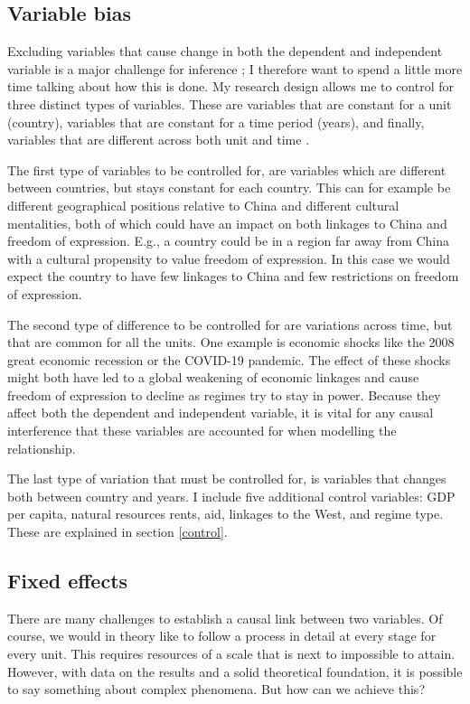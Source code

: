 \subsection{Variable bias}
Excluding variables that cause change in both the dependent and independent variable is a major challenge for inference \citep[pp. 205-210]{toshkov_research_2016}; I therefore want to spend a little more time talking about how this is done. My research design allows me to control for three distinct types of variables. These are variables that are constant for a unit (country), variables that are constant for a time period (years), and finally, variables that are different across both unit and time \citep{huntington-klein_effect_2022}. 

The first type of variables to be controlled for, are variables which are different between countries, but stays constant for each country. This can for example be different geographical positions relative to China and different cultural mentalities, both of which could have an impact on both linkages to China and freedom of expression. E.g., a country could be in a region far away from China with a cultural propensity to value freedom of expression. In this case we would expect the country to have few linkages to China and few restrictions on freedom of expression.

The second type of difference to be controlled for are variations across time, but that are common for all the units. One example is economic shocks like the 2008 great economic recession or the COVID-19 pandemic. The effect of these shocks might both have led to a global weakening of economic linkages and cause freedom of expression to decline as regimes try to stay in power. Because they affect both the dependent and independent variable, it is vital for any causal interference that these variables are accounted for when modelling the relationship.

The last type of variation that must be controlled for, is variables that changes both between country and years. I include five additional control variables: GDP per capita, natural resources rents, aid, linkages to the West, and regime type. These are explained in section \ref{control}.

\subsection{Fixed effects}
There are many challenges to establish a causal link between two variables. Of course, we would in theory like to follow a process in detail at every stage for every unit. This requires resources of a scale that is next to impossible to attain. However, with data on the results and a solid theoretical foundation, it is possible to say something about complex phenomena. But how can we achieve this?

